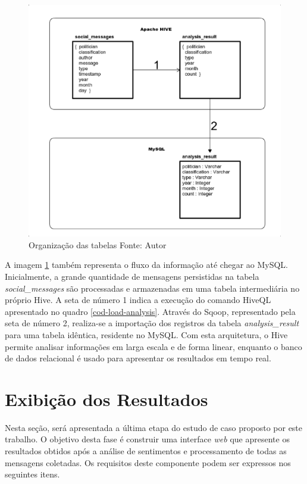 \begin{figure}[ht!]
	\centering
	\includegraphics[keepaspectratio=true,scale=0.6]
	  {figuras/database.eps}
	\caption[Organização das tabelas]{Organização das tabelas
	\protect\linebreak Fonte: Autor}
	\label{tables}
\end{figure}
\FloatBarrier

A imagem \ref{tables} também representa o fluxo da informação até chegar ao MySQL. Inicialmente, a grande quantidade de mensagens persistidas na tabela \textit{social\_messages} são processadas e armazenadas em uma tabela intermediária no próprio Hive. A seta de número 1 indica a execução do comando HiveQL apresentado no quadro \ref{cod-load-analysis}. Através do Sqoop, representado pela seta de número 2, realiza-se a importação dos registros da tabela \textit{analysis\_result} para uma tabela idêntica, residente no MySQL. Com esta arquitetura, o Hive permite analisar informações em larga escala e de forma linear, enquanto o banco de dados relacional é usado para apresentar os resultados em tempo real.

\section{Exibição dos Resultados}

Nesta seção, será apresentada a última etapa do estudo de caso proposto por este trabalho. O objetivo desta fase é construir uma interface \textit{web} que apresente os resultados obtidos após a análise de sentimentos e processamento de todas as mensagens coletadas. Os requisitos deste componente podem ser expressos nos seguintes itens.

